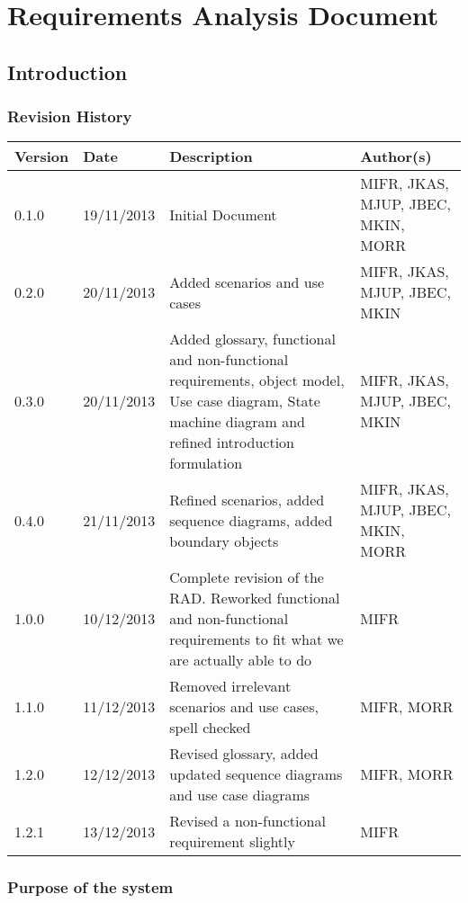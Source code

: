 \chapter{Requirements Analysis Document}

\section{Introduction}
\label{sec:introduction}

\subsection{Revision History}
\begin{center}
    \begin{tabular}{ | l | l | p{6cm} | p{4cm} |}
    \hline
    Version & Date & Description & Author(s) \\ \hline
    0.1.0 & 19/11/2013 & Initial Document & MIFR, JKAS, MJUP, JBEC, MKIN, MORR
    \\ \hline
    0.2.0 & 20/11/2013 & Added scenarios and use cases & MIFR, JKAS, MJUP, JBEC, MKIN
    \\ \hline
    0.3.0 & 20/11/2013 & Added glossary, functional and non-functional requirements, object model, Use case diagram, State machine diagram and refined introduction formulation & MIFR, JKAS, MJUP, JBEC, MKIN
    \\ \hline
    0.4.0 & 21/11/2013 & Refined scenarios, added sequence diagrams, added boundary objects & MIFR, JKAS, MJUP, JBEC, MKIN, MORR
    \\ \hline
    1.0.0 & 10/12/2013 & Complete revision of the RAD. Reworked functional and non-functional requirements to fit what we are actually able to do & MIFR
    \\ \hline
    1.1.0 & 11/12/2013 & Removed irrelevant scenarios and use cases, spell checked & MIFR, MORR
    \\ \hline
    1.2.0 & 12/12/2013 & Revised glossary, added updated sequence diagrams and use case diagrams & MIFR, MORR
    \\ \hline
    1.2.1 & 13/12/2013 & Revised a non-functional requirement slightly & MIFR
    \\ \hline
    \end{tabular}
\end{center}

\subsection{Purpose of the system}


